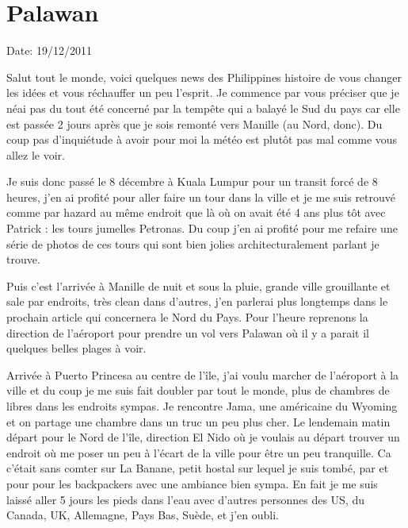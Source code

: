 \section{Palawan}

Date: 19/12/2011

\begin{multicols}{2}

Salut tout le monde, voici quelques news des Philippines histoire de vous changer les idées et vous réchauffer un peu l'esprit.
Je commence par vous préciser que je néai pas du tout été concerné par la tempête qui a balayé le Sud du pays car elle est passée 2 jours après que je sois remonté vers Manille (au Nord, donc). Du coup pas d'inquiétude à avoir pour moi la météo est plutôt pas mal comme vous allez le voir.

Je suis donc passé le 8 décembre à Kuala Lumpur pour un transit forcé de 8 heures, j'en ai profité pour aller faire un tour dans la ville et je me suis retrouvé comme par hazard au même endroit que là où on avait été 4 ans plus tôt avec Patrick : les tours jumelles Petronas. Du coup j'en ai profité pour me refaire une série de photos de ces tours qui sont bien jolies architecturalement parlant je trouve.


Puis c'est l'arrivée à Manille de nuit et sous la pluie, grande ville grouillante et sale par endroits, très clean dans d'autres, j'en parlerai plus longtemps dans le prochain article qui concernera le Nord du Pays. Pour l'heure reprenons la direction de l'aéroport pour prendre un vol vers Palawan où il y a parait il quelques belles plages à voir.

Arrivée à Puerto Princesa au centre de l'île, j'ai voulu marcher de l'aéroport à la ville et du coup je me suis fait doubler par tout le monde, plus de chambres de libres dans les endroits sympas. Je rencontre Jama, une américaine du Wyoming et on partage une chambre dans un truc un peu plus cher. Le lendemain matin départ pour le Nord de l'île, direction El Nido où je voulais au départ trouver un endroit où me poser un peu à l'écart de la ville pour être un peu tranquille. Ca c'était sans comter sur La Banane, petit hostal sur lequel je suis tombé, par et pour pour les backpackers avec une ambiance bien sympa. En fait je me suis laissé aller 5 jours les pieds dans l'eau avec d'autres personnes des US, du Canada, UK, Allemagne, Pays Bas, Suède, et j'en oubli.


\end{multicols}
